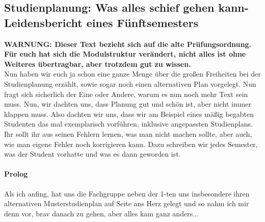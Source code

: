 \subsection{Studienplanung: Was alles schief gehen kann-
  Leidensbericht eines Fünftsemesters}
  \textbf{WARNUNG: Dieser Text bezieht sich auf die alte
  Prüfungsordnung. Für euch hat sich die Modulstruktur verändert, nicht
  alles ist ohne Weiteres übertragbar, aber trotzdem gut zu wissen.}\\
Nun haben wir euch ja schon eine ganze Menge über die großen
Freiheiten bei der Studienplanung erzählt, sowie sogar noch einen
alternativen Plan vorgelegt. Nun fragt sich sicherlich der Eine oder
Andere, warum es nun noch mehr Text sein muss. Nun, wir dachten uns,
dass Planung gut und schön ist, aber nicht immer klappen muss. Also
dachten wir uns, dass wir am Beispiel eines mäßig begabten Studenten
das mal exemplarisch vorführen, inklusive angepassten
Studienplans. 
Ihr sollt ihr aus seinen Fehlern lernen, was man nicht machen sollte, aber
auch, wie man eigene Fehler noch korrigieren kann. Dazu schreiben wir
jedes Semester, was der Student vorhatte und was es dann geworden ist.
\paragraph{Prolog}
Als ich anfing, hat uns die Fachgruppe neben der 1-ten uns
insbesondere ihren alternativen Musterstudienplan auf Seite 
\pageref{studienplan_neu}
ans Herz gelegt und
so nahm ich mir denn vor, brav danach zu gehen, aber alles kam ganz
anders...
